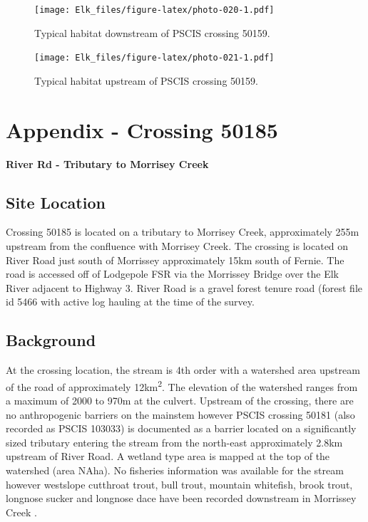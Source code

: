 \documentclass[
]{book}
\begin{document}
\begin{figure}
\centering
\texttt{[image: Elk\_files/figure-latex/photo-020-1.pdf]}
\caption{\label{fig:photo-020}Typical habitat downstream of PSCIS crossing 50159.}
\end{figure}

\begin{figure}
\centering
\texttt{[image: Elk\_files/figure-latex/photo-021-1.pdf]}
\caption{\label{fig:photo-021}Typical habitat upstream of PSCIS crossing 50159.}
\end{figure}

\hypertarget{appendix---crossing-50185}{%
\chapter*{Appendix - Crossing 50185}\label{appendix---crossing-50185}}

\textbf{River Rd - Tributary to Morrisey Creek}

\hypertarget{site-location-2}{%
\section*{Site Location}\label{site-location-2}}

Crossing 50185 is located on a tributary to Morrisey Creek, approximately 255m upstream from the confluence with Morrisey Creek. The crossing is located on River Road just south of Morrissey approximately 15km south of Fernie. The road is accessed off of Lodgepole FSR via the Morrissey Bridge over the Elk River adjacent to Highway 3. River Road is a gravel forest tenure road (forest file id 5466 with active log hauling at the time of the survey.

\hypertarget{background-3}{%
\section*{Background}\label{background-3}}

At the crossing location, the stream is 4th order with a watershed area upstream of the road of approximately 12km\textsuperscript{2}. The elevation of the watershed ranges from a maximum of 2000 to 970m at the culvert. Upstream of the crossing, there are no anthropogenic barriers on the mainstem however PSCIS crossing 50181 (also recorded as PSCIS 103033) is documented as a barrier located on a significantly sized tributary entering the stream from the north-east approximately 2.8km upstream of River Road. A wetland type area is mapped at the top of the watershed (area NAha). No fisheries information was available for the stream \citep{moeStreamInventorySample} however westslope cutthroat trout, bull trout, mountain whitefish, brook trout, longnose sucker and longnose dace have been recorded downstream in Morrissey Creek \citep{data_fish_obs}.
\end{document}
